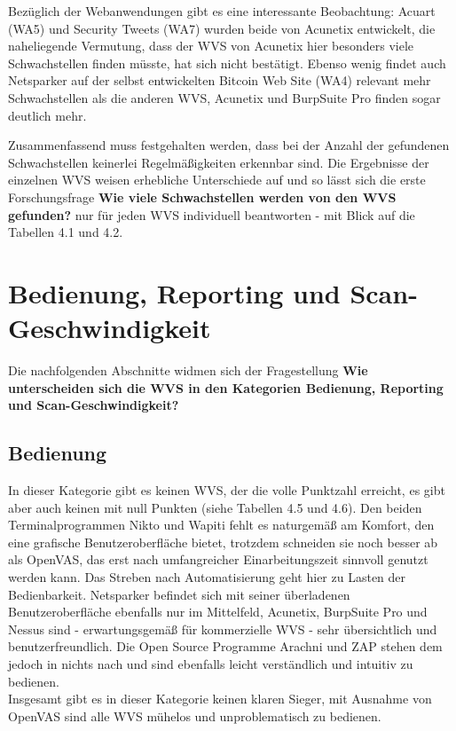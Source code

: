 \documentclass[12pt,oneside,a4paper,parskip,pointlessnumbers]{scrbook}
\begin{document}
  Bezüglich der Webanwendungen gibt es eine interessante Beobachtung:  Acuart (WA5) und Security Tweets (WA7) wurden beide von Acunetix entwickelt, die naheliegende Vermutung, dass der WVS von Acunetix hier besonders viele Schwachstellen finden müsste, hat sich nicht bestätigt.
  Ebenso wenig findet auch Netsparker auf der selbst entwickelten Bitcoin Web Site (WA4) relevant mehr Schwachstellen als die anderen WVS, Acunetix und BurpSuite Pro finden sogar deutlich mehr.

  Zusammenfassend muss festgehalten werden, dass bei der Anzahl der gefundenen Schwachstellen keinerlei Regelmäßigkeiten erkennbar sind. Die Ergebnisse der einzelnen WVS weisen erhebliche Unterschiede auf und so lässt sich die erste Forschungsfrage \textbf{Wie viele Schwachstellen werden von den WVS gefunden?} nur für jeden WVS individuell beantworten - mit Blick auf die Tabellen 4.1 und 4.2.

  \section{Bedienung, Reporting und Scan-Geschwindigkeit}
  Die nachfolgenden Abschnitte widmen sich der Fragestellung \textbf{Wie unterscheiden sich die WVS in den Kategorien Bedienung, Reporting und Scan-Geschwindigkeit?}
  \subsection{Bedienung}
  In dieser Kategorie gibt es keinen WVS, der die volle Punktzahl erreicht, es gibt aber auch keinen mit null Punkten (siehe Tabellen 4.5 und 4.6). Den beiden Terminalprogrammen Nikto und Wapiti fehlt es naturgemäß am Komfort, den eine grafische Benutzeroberfläche bietet, trotzdem schneiden sie noch besser ab als OpenVAS, das erst nach umfangreicher Einarbeitungszeit sinnvoll genutzt werden kann. Das Streben nach Automatisierung geht hier zu Lasten der Bedienbarkeit. Netsparker befindet sich mit seiner überladenen Benutzeroberfläche ebenfalls nur im Mittelfeld, Acunetix, BurpSuite Pro und Nessus sind - erwartungsgemäß für kommerzielle WVS - sehr übersichtlich und benutzerfreundlich.
  Die Open Source Programme Arachni und ZAP stehen dem jedoch in nichts nach und sind ebenfalls leicht verständlich und intuitiv zu bedienen. \\
  Insgesamt gibt es in dieser Kategorie keinen klaren Sieger, mit Ausnahme von OpenVAS sind alle WVS mühelos und unproblematisch zu bedienen.
\end{document}
